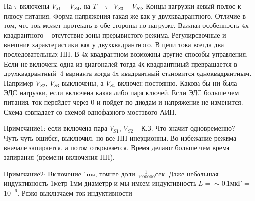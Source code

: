 На $\tau$ включены $V_{S1} - V_{S4}$, на $T-\tau$ --$V_{S3} - V_{S2}$. Концы нагрузки левый полюс к плюсу питания. Форма напряжения такая же как у двухквадрантного.
Отличие в том, что ток может протекать в обе стороны по нагрузке. Важная особенность 4х квадрантного -- отсутствие зоны прерывистого режима.
Регулировочные и внешние характеристики как у двухквадрантного. В цепи тока всегда два последовательных ПП. В 4х квадрантном возможны другие способы управления.
Если не включена одна из диагоналей тогда 4х квадрантниый превращается в друхквадрантный. 4 варианта когда 4х квадрантный становится одноквадрантным. Например
$V_{S2}$, $V_{S3}$ выключены, а $V_{S4}$ включен постоянно. Какова бы ни была ЭДС нагрузки, если включена какая либо пара ключей. 
Если ЭДС больше чем питания, ток перейдет через 0 и пойдет по диодам и напряжение не изменится.
Схема совпадает со схемой однофазного мостового АИН.

Примечание1: если включена пара $V_{S1}$, $V_{S2}$ -- К.З. Что значит одновременно? Чуть-чуть ошибся, выключил, но все ПП инерционны. Во избежание режима вначале запирается, а потом открывается.
Время делают больше чем время запирания (времени включения ПП).

Примечание2: Включение 1ms, точнее доли $\frac{1}{1000000}$сек. Даже небольшая индуктивность 1метр 1мм диаметрр и мы имеем индуктивность $L=\sim0.1$мкГ = $10^{-6}$.
Резко выключаем ток индуктивности




